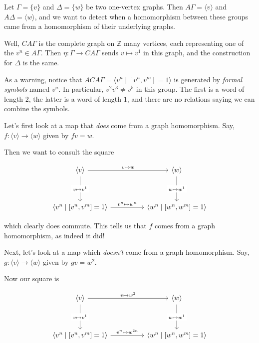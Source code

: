 \documentclass[12pt]{article}
\theoremstyle{definition}
\theoremstyle{theorem}
\begin{document}


Let $\Gamma = \{ v \}$ and $\Delta = \{ w \}$ be two one-vertex graphs.
Then $A \Gamma = \langle v \rangle$ and $A \Delta = \langle w \rangle$,
and we want to detect when a homomorphism between these groups came from a
homomorphism of their underlying graphs.

Well, $CA \Gamma$ is the complete graph on $\mathbb{Z}$ many vertices, each
representing one of the $v^n \in A \Gamma$. 
Then $\eta : \Gamma \to CA \Gamma$ sends $v \mapsto v^1$ in this graph,
and the construction for $\Delta$ is the same.

As a warning, notice that $ACA\Gamma = \langle v^n \mid [v^n, v^m] = 1 \rangle$
is generated by \emph{formal symbols} named $v^n$. In particular,
$v^2 v^3 \neq v^5$ in this group. The first is a word of length $2$, the latter
is a word of length $1$, and there are no relations saying we can combine
the symbols.

\bigskip

Let's first look at a map that \emph{does} come from a graph homomorphism.
Say, $f : \langle v \rangle \to \langle w \rangle$ given by $fv = w$.

Then we want to consult the square

\[\begin{tikzcd}
	{\langle v \rangle} && {\langle w \rangle} \\
	\\
	{\langle v^n \mid [v^n,v^m] = 1 \rangle} && {\langle w^n \mid [w^n, w^m] = 1 \rangle}
	\arrow["{v \mapsto w}", from=1-1, to=1-3]
	\arrow["{v^n \mapsto w^n}", from=3-1, to=3-3]
	\arrow["{v \mapsto v^1}"{description}, from=1-1, to=3-1]
	\arrow["{w \mapsto w^1}"{description}, from=1-3, to=3-3]
\end{tikzcd}\]

which clearly does commute. This tells us that $f$ comes from a graph homomorphism,
as indeed it did!

\bigskip

Next, let's look at a map which \emph{doesn't} come from a graph homomorphism.
Say, $g : \langle v \rangle \to \langle w \rangle$ given by $gv = w^2$.

Now our square is

\[\begin{tikzcd}
	{\langle v \rangle} && {\langle w \rangle} \\
	\\
	{\langle v^n \mid [v^n,v^m] = 1 \rangle} && {\langle w^n \mid [w^n, w^m] = 1 \rangle}
	\arrow["{v \mapsto w^2}", from=1-1, to=1-3]
	\arrow["{v^n \mapsto w^{2n}}", from=3-1, to=3-3]
	\arrow["{v \mapsto v^1}"{description}, from=1-1, to=3-1]
	\arrow["{w \mapsto w^1}"{description}, from=1-3, to=3-3]
\end{tikzcd}\]
\end{document}
